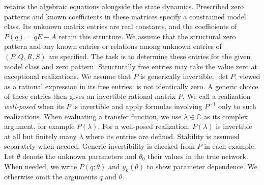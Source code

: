 \documentclass[journal,twoside,web]{ieeecolor}
\begin{document}
retains the algebraic equations alongside the state dynamics.
Prescribed zero patterns and known coefficients in these matrices
specify a constrained model class. Its unknown matrix entries are real
constants, and the coefficients of $P(q)=qE-A$ retain this structure.
We assume that the structural zero pattern and any known entries or relations
among unknown entries of $(P,Q,R,S)$ are specified. The task is to determine
these entries for the given model class and zero pattern.
Structurally free entries may take the value zero at exceptional realizations.
We assume that $P$ is generically invertible: $\det P$, viewed as a rational
expression in its free entries, is not identically zero. A generic choice
of these entries then gives an invertible rational matrix $P$. We call
a realization {\it well-posed} when its $P$ is invertible and apply formulas
involving $P^{-1}$ only to such realizations. When evaluating a transfer
function, we use $\lambda\in\mathbb C$ as its complex argument, for example
$P(\lambda)$. For a well-posed realization, $P(\lambda)$ is invertible at
all but finitely many $\lambda$ where its entries are defined. Stability is
assumed separately when needed. Generic invertibility is checked from $P$
in each example.
Let $\theta$ denote the unknown parameters and $\theta_0$ their values in the
true network. When needed, we write $P(q;\theta)$ and $y_k(\theta)$ to show
parameter dependence. We otherwise omit the arguments $q$ and $\theta$.
%
\end{document}
